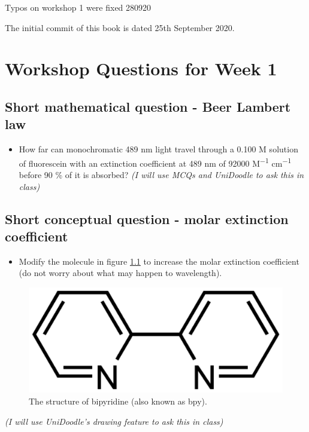 \documentclass[
]{book}
\providecommand{\tightlist}{%
  \setlength{\itemsep}{0pt}\setlength{\parskip}{0pt}}
\begin{document}
Typos on workshop 1 were fixed 280920

The initial commit of this book is dated 25th September 2020.

\hypertarget{ch:Workshop1}{%
\chapter{Workshop Questions for Week 1}\label{ch:Workshop1}}

\hypertarget{sec:BeerLambert}{%
\section{Short mathematical question - Beer Lambert law}\label{sec:BeerLambert}}

\begin{itemize}
\tightlist
\item
  How far can monochromatic 489 nm light travel through a 0.100 M solution of fluorescein with an extinction coefficient at 489 nm of 92000 M\textsuperscript{−1} cm\textsuperscript{−1} before 90 \% of it is absorbed?
  \emph{(I will use MCQs and UniDoodle to ask this in class)}
\end{itemize}

\hypertarget{sec:MolarExtinction}{%
\section{Short conceptual question - molar extinction coefficient}\label{sec:MolarExtinction}}

\begin{itemize}
\tightlist
\item
  Modify the molecule in figure \ref{fig:bpy} to increase the molar extinction coefficient (do not worry about what may happen to wavelength).
\end{itemize}

\begin{figure}

{\centering \includegraphics[width=0.3\linewidth]{images/bpy} 

}

\caption{The structure of bipyridine (also known as bpy).}\label{fig:bpy}
\end{figure}

\emph{(I will use UniDoodle's drawing feature to ask this in class)}
\end{document}
